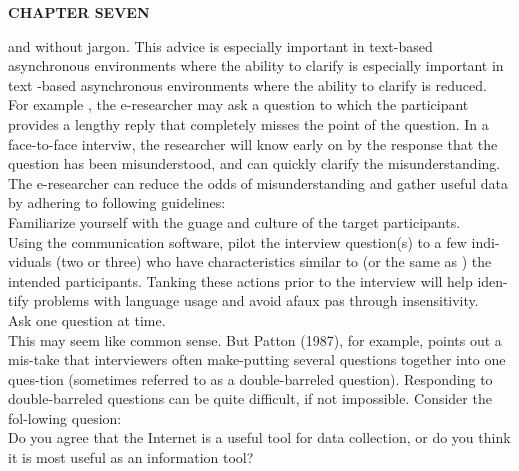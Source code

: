 \documentclass[a4paper]{book}
\begin{document}
\begin{flushleft}
\textbf{CHAPTER SEVEN}
\end{flushleft}
and without jargon. This advice is especially important in text-based asynchronous environments where the ability to clarify is especially important in text -based asynchronous environments where the ability to clarify is reduced. For example , the e-researcher may ask a question to which the participant provides a lengthy reply that completely misses the point of the question. In a face-to-face interviw, the researcher will know early on by the response that the question has been misunderstood, and can quickly clarify the misunderstanding. The e-researcher can reduce the odds of misunderstanding and gather useful data by adhering to following guidelines:\\

\vspace{2mm}
 Familiarize yourself with the guage and culture of the target participants.\\
 Using the communication software, pilot the interview question(s) to a few indi-viduals (two or three) who have characteristics similar to (or the same as ) the intended participants. Tanking these actions prior to the interview will help iden-tify problems with language usage and avoid afaux pas through insensitivity.\\
 Ask one question at time.\\

\vspace{2mm}
This may seem like common sense. But Patton (1987), for example, points out a mis-take that interviewers often make-putting several questions together into one ques-tion (sometimes referred to as a double-barreled question). Responding to double-barreled questions can be quite difficult, if not impossible. Consider the fol-lowing quesion:\\


\vspace{2mm} 
Do you agree that the Internet is a useful tool for data collection, or do you think it is most useful as an information tool?
\end{document}
